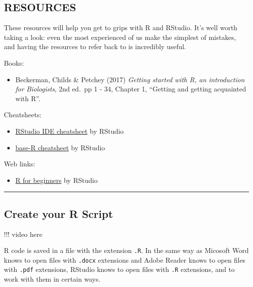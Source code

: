 \documentclass[
]{book}
\providecommand{\tightlist}{%
  \setlength{\itemsep}{0pt}\setlength{\parskip}{0pt}}
\begin{document}
\hypertarget{resources}{%
\subsection{RESOURCES}\label{resources}}

These resources will help you get to grips with R and RStudio. It's well worth
taking a look: even the most experienced of us make the simplest of mistakes,
and having the resources to refer back to is incredibly useful.

Books:

\begin{itemize}
\tightlist
\item
  Beckerman, Childs \& Petchey (2017) \emph{Getting started with R, an
  introduction for Biologists}, 2nd ed.~pp 1 - 34, Chapter 1, ``Getting and
  getting acquainted with R''.
  ~
\end{itemize}

Cheatsheets:

\begin{itemize}
\tightlist
\item
  \href{https://github.com/rstudio/cheatsheets/raw/master/rstudio-ide.pdf}{RStudio IDE cheatsheet} by RStudio
\item
  \href{http://github.com/rstudio/cheatsheets/raw/master/base-r.pdf}{base-R cheatsheet} by RStudio
  ~
\end{itemize}

Web links:

\begin{itemize}
\tightlist
\item
  \href{https://education.rstudio.com/learn/beginner}{R for beginners} by RStudio\\
  \hspace*{0.333em}
\end{itemize}

\begin{center}\rule{0.5\linewidth}{0.5pt}\end{center}

\hypertarget{create-your-r-script}{%
\subsection{Create your R Script}\label{create-your-r-script}}

!!! video here

R code is saved in a file with the extension \texttt{.R}. In the same way as Micosoft
Word knows to open files with \texttt{.docx} extensions and Adobe Reader knows to
open files with \texttt{.pdf} extensions, RStudio knows to open files with \texttt{.R}
extensions, and to work with them in certain ways.
\end{document}
